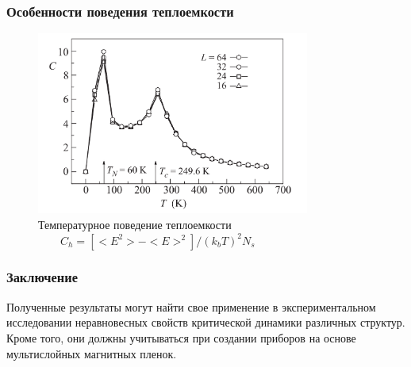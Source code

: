 \documentclass[pdf,unicode]{beamer}
\begin{document}
\begin{frame}
\frametitle{Особенности поведения теплоемкости}

\begin{figure}
	\includegraphics[width=0.8\textwidth]{Image3.png}
	\vspace{5pt}
	\caption{\scriptsize  Температурное поведение теплоемкости \\~~~~$C_h = [<E^2>-<E>^2]/(k_b T)^2 N_s$}
	
\end{figure}
\end{frame}

\begin{frame}
\frametitle{Заключение}
Полученные результаты могут найти свое применение в экспериментальном исследовании неравновесных свойств критической динамики различных структур. Кроме того, они должны учитываться при создании приборов на основе мультислойных магнитных пленок.
\end{frame}
\end{document}
